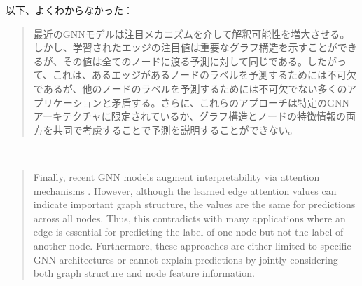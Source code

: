 \documentclass[a4paper,10pt]{ltjsarticle}
\newcommand{\1}{\mbox{1}\hspace{-0.25em}\mbox{l}}
\theoremstyle{definition}
\begin{document}
    以下、よくわからなかった：
    \begin{quotation}
        最近のGNNモデルは注目メカニズムを介して解釈可能性を増大させる\cite{schlichtkrull2020interpreting, velivckovic2017graph, xie2018crystal}。
        しかし、学習されたエッジの注目値は重要なグラフ構造を示すことができるが、その値は全てのノードに渡る予測に対して同じである。したがって、これは、あるエッジがあるノードのラベルを予測するためには不可欠であるが、他のノードのラベルを予測するためには不可欠でない多くのアプリケーションと矛盾する。さらに、これらのアプローチは特定のGNNアーキテクチャに限定されているか、グラフ構造とノードの特徴情報の両方を共同で考慮することで予測を説明することができない。
    \end{quotation}
    \\
    \begin{quotation}
        Finally, recent GNN models augment interpretability via attention mechanisms \cite{schlichtkrull2020interpreting, velivckovic2017graph, xie2018crystal}.
        However, although the learned edge attention values can indicate important graph structure, the values are the same for predictions across all nodes. Thus, this contradicts with many applications where an edge is essential for predicting the label of one node but not the label of another node. Furthermore, these approaches are either limited to speciﬁc GNN architectures or cannot explain predictions by jointly considering both graph structure and node feature information.
    \end{quotation}
\end{document}
